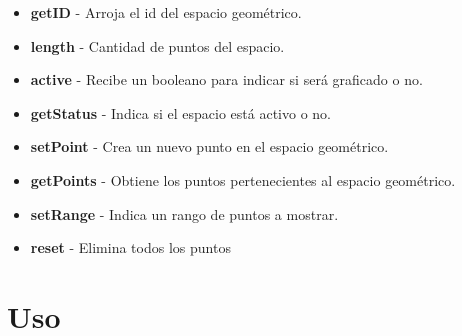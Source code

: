 \documentclass[10pt]{article}
\begin{document}
\begin{itemize}
	\item \textbf{getID} - Arroja el id del espacio geométrico.
	\item \textbf{length} - Cantidad de puntos del espacio.
	\item \textbf{active} - Recibe un booleano para indicar si será graficado o no.
	\item \textbf{getStatus} - Indica si el espacio está activo o no.
	\item \textbf{setPoint} - Crea un nuevo punto en el espacio geométrico.
	\item \textbf{getPoints} - Obtiene los puntos pertenecientes al espacio geométrico.
	\item \textbf{setRange} - Indica un rango de puntos a mostrar.
	\item \textbf{reset} - Elimina todos los puntos 
\end{itemize}
\newpage
\section{Uso}
\end{document}
